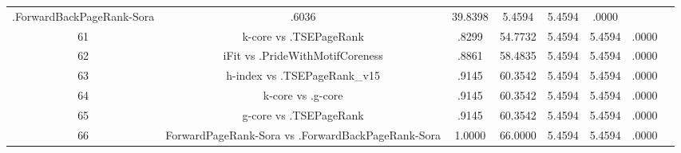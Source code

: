 \documentclass[a4paper,10pt]{article}
\begin{document}
\begin{landscape}
\begin{table}[!htp]
\begin{tabular}{cccccccc}
.ForwardBackPageRank-Sora&.6036&39.8398&5.4594&5.4594&.0000\\61&k-core vs .TSEPageRank&.8299&54.7732&5.4594&5.4594&.0000\\62&iFit vs .PrideWithMotifCoreness&.8861&58.4835&5.4594&5.4594&.0000\\63&h-index vs .TSEPageRank_v15&.9145&60.3542&5.4594&5.4594&.0000\\64&k-core vs .g-core&.9145&60.3542&5.4594&5.4594&.0000\\65&g-core vs .TSEPageRank&.9145&60.3542&5.4594&5.4594&.0000\\66&ForwardPageRank-Sora vs .ForwardBackPageRank-Sora&1.0000&66.0000&5.4594&5.4594&.0000\\\hline
\end{tabular}
\end{table}

\end{landscape}
\end{document}
